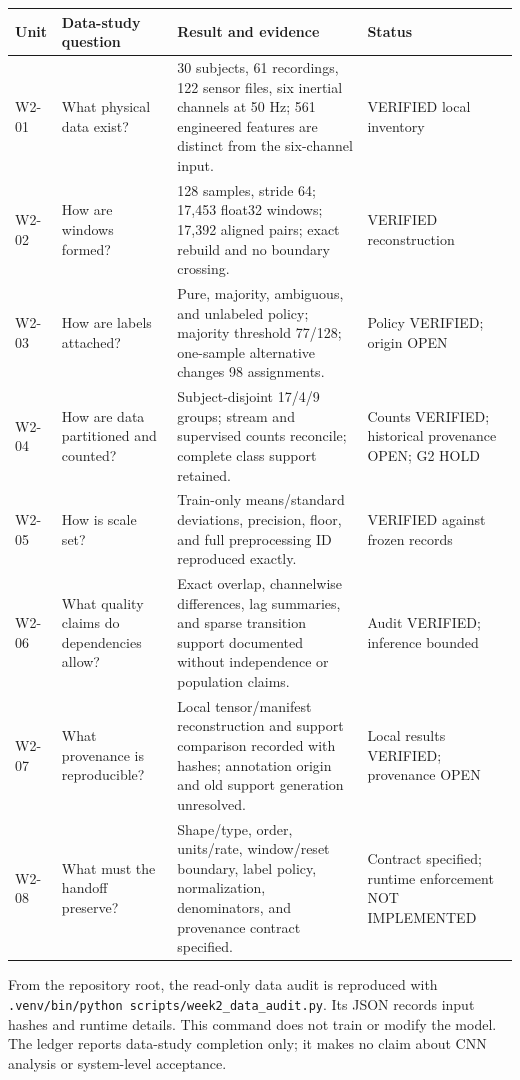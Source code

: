 \documentclass[11pt,a4paper]{article}
\newcommand{\code}[1]{{\small\ttfamily\nolinkurl{#1}}}
\begin{document}
\begin{longtable}{@{}P{1.5cm}P{3.3cm}P{6.8cm}P{3.3cm}@{}}\toprule
Unit & Data-study question & Result and evidence & Status\\\midrule\endhead
W2-01 & What physical data exist? & 30 subjects, 61 recordings, 122 sensor files, six inertial channels at 50 Hz; 561 engineered features are distinct from the six-channel input. & VERIFIED local inventory\\
W2-02 & How are windows formed? & 128 samples, stride 64; 17,453 float32 windows; 17,392 aligned pairs; exact rebuild and no boundary crossing. & VERIFIED reconstruction\\
W2-03 & How are labels attached? & Pure, majority, ambiguous, and unlabeled policy; majority threshold 77/128; one-sample alternative changes 98 assignments. & Policy VERIFIED; origin OPEN\\
W2-04 & How are data partitioned and counted? & Subject-disjoint 17/4/9 groups; stream and supervised counts reconcile; complete class support retained. & Counts VERIFIED; historical provenance OPEN; G2 HOLD\\
W2-05 & How is scale set? & Train-only means/standard deviations, precision, floor, and full preprocessing ID reproduced exactly. & VERIFIED against frozen records\\
W2-06 & What quality claims do dependencies allow? & Exact overlap, channelwise differences, lag summaries, and sparse transition support documented without independence or population claims. & Audit VERIFIED; inference bounded\\
W2-07 & What provenance is reproducible? & Local tensor/manifest reconstruction and support comparison recorded with hashes; annotation origin and old support generation unresolved. & Local results VERIFIED; provenance OPEN\\
W2-08 & What must the handoff preserve? & Shape/type, order, units/rate, window/reset boundary, label policy, normalization, denominators, and provenance contract specified. & Contract specified; runtime enforcement NOT IMPLEMENTED\\
\bottomrule\end{longtable}

From the repository root, the read-only data audit is reproduced with \code{.venv/bin/python scripts/week2_data_audit.py}. Its JSON records input hashes and runtime details. This command does not train or modify the model. The ledger reports data-study completion only; it makes no claim about CNN analysis or system-level acceptance.
\end{document}
